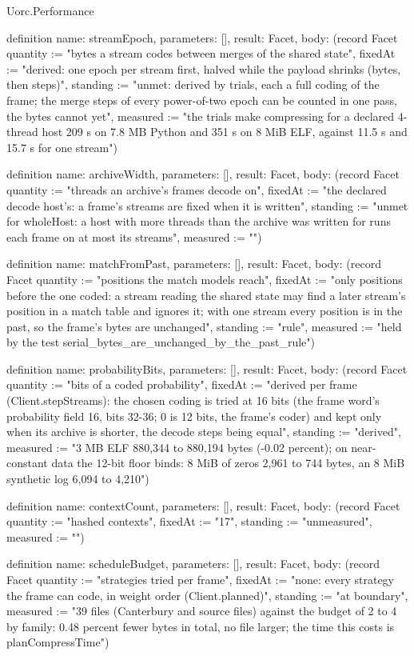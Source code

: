 \begin{lexlean}{Uorc.Performance}
\begin{semanticmodule}
definition{
  name: streamEpoch,
  parameters: [],
  result: Facet,
  body: (record Facet {quantity := "bytes a stream codes between merges of the shared state", fixedAt := "derived: one epoch per stream first, halved while the payload shrinks (bytes, then steps)", standing := "unmet: derived by trials, each a full coding of the frame; the merge steps of every power-of-two epoch can be counted in one pass, the bytes cannot yet", measured := "the trials make compressing for a declared 4-thread host 209 s on 7.8 MB Python and 351 s on 8 MiB ELF, against 11.5 s and 15.7 s for one stream"})
}

definition{
  name: archiveWidth,
  parameters: [],
  result: Facet,
  body: (record Facet {quantity := "threads an archive's frames decode on", fixedAt := "the declared decode host's: a frame's streams are fixed when it is written", standing := "unmet for wholeHost: a host with more threads than the archive was written for runs each frame on at most its streams", measured := ""})
}

definition{
  name: matchFromPast,
  parameters: [],
  result: Facet,
  body: (record Facet {quantity := "positions the match models reach", fixedAt := "only positions before the one coded: a stream reading the shared state may find a later stream's position in a match table and ignores it; with one stream every position is in the past, so the frame's bytes are unchanged", standing := "rule", measured := "held by the test serial_bytes_are_unchanged_by_the_past_rule"})
}

definition{
  name: probabilityBits,
  parameters: [],
  result: Facet,
  body: (record Facet {quantity := "bits of a coded probability", fixedAt := "derived per frame (Client.stepStreams): the chosen coding is tried at 16 bits (the frame word's probability field 16, bits 32-36; 0 is 12 bits, the frame's coder) and kept only when its archive is shorter, the decode steps being equal", standing := "derived", measured := "3 MB ELF 880,344 to 880,194 bytes (-0.02 percent); on near-constant data the 12-bit floor binds: 8 MiB of zeros 2,961 to 744 bytes, an 8 MiB synthetic log 6,094 to 4,210"})
}

definition{
  name: contextCount,
  parameters: [],
  result: Facet,
  body: (record Facet {quantity := "hashed contexts", fixedAt := "17", standing := "unmeasured", measured := ""})
}

definition{
  name: scheduleBudget,
  parameters: [],
  result: Facet,
  body: (record Facet {quantity := "strategies tried per frame", fixedAt := "none: every strategy the frame can code, in weight order (Client.planned)", standing := "at boundary", measured := "39 files (Canterbury and source files) against the budget of 2 to 4 by family: 0.48 percent fewer bytes in total, no file larger; the time this costs is planCompressTime"})
}


\end{semanticmodule}
\end{lexlean}
